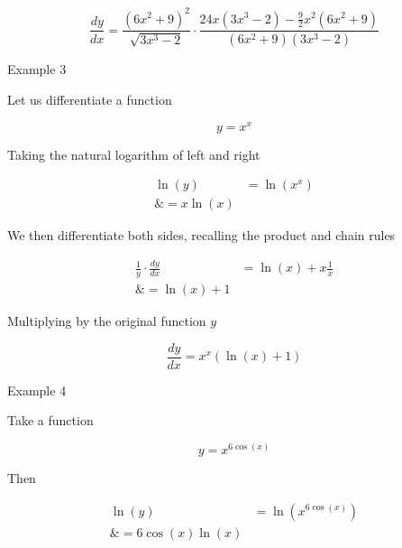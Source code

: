 $$\frac{dy}{dx}=\frac{(6x^2+9)^2}{\sqrt{3x^3-2}}\cdot\frac{24x(3x^3-2)-\frac{9}{2}x^2(6x^2+9)}{(6x^2+9)(3x^3-2)}$$ 



Example 3



Let us differentiate a function



$$y=x^x$$ 



Taking the natural logarithm of left and right

                                                                      

 \begin{align}
\ln(y)&=\ln(x^x) \\\&=x\ln(x)
\end{align} 



We then differentiate both sides, recalling the product and chain rules    

                                                                      

 \begin{align}
\frac{1}{y}\cdot\frac{dy}{dx}&=\ln(x)+x\frac{1}{x} \\\&=\ln(x)+1
\end{align}



 Multiplying by the original function $y$                             

                                                                     

 $$\frac{dy}{dx}=x^x(\ln(x)+1)$$                                     





Example 4



 Take a function

                                                              

 $$y=x^{6\cos(x)}$$



Then                                              

                                                                     

 \begin{align}
\ln(y)&=\ln(x^{6\cos(x)}) \\\&=6\cos(x)\ln(x)
\end{align} 



